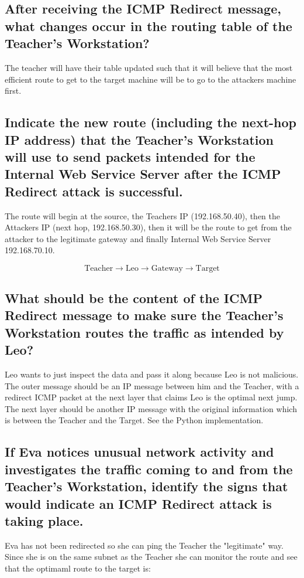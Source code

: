 \documentclass{article}
\begin{document}
\subsection{After receiving the ICMP Redirect message, what changes occur in the routing
table of the Teacher’s Workstation?}
	The teacher will have their table updated such that it will believe that the most efficient route to get to the target machine
	will be to go to the attackers machine first.

\subsection{Indicate the new route (including the next-hop IP address) that the Teacher’s
Workstation will use to send packets intended for the Internal Web Service Server after
the ICMP Redirect attack is successful.}
	The route will begin at the source, the Teachers IP (192.168.50.40), then the Attackers IP (next hop, 192.168.50.30), then it will be the route
	to get from the attacker to the legitimate gateway and finally Internal Web Service Server 192.168.70.10.

	\[
		\text{Teacher} \xrightarrow{} \text{Leo} \xrightarrow{} \text{Gateway} \xrightarrow{} \text{Target}
	\]

\subsection{What should be the content of the ICMP Redirect message to make sure the
Teacher’s Workstation routes the traffic as intended by Leo?}
	Leo wants to just inspect the data and pass it along because Leo is not malicious. The outer message should be an IP message between
	him and the Teacher, with a redirect ICMP packet at the next layer that claims Leo is the optimal next jump. The next layer should be another IP message with
	the original information which is between the Teacher and the Target. See the Python implementation.

\subsection{If Eva notices unusual network activity and investigates the traffic coming to
and from the Teacher’s Workstation, identify the signs that would indicate an ICMP
Redirect attack is taking place.}

	Eva has not been redirected so she can ping the Teacher the "legitimate" way. Since she is on the same subnet as the Teacher she can monitor the route
	and see that the optimaml route to the target is:
	
\end{document}
